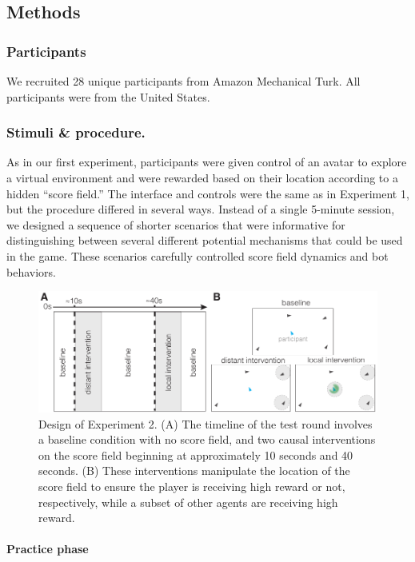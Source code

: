 \documentclass[12pt,letterpaper]{article}
\begin{document}
\subsection{Methods}
\subsubsection{Participants}

We recruited 28 unique participants from Amazon Mechanical Turk.
All participants were from the United States.

\subsubsection{Stimuli \& procedure.}

As in our first experiment, participants were given control of an avatar to explore a virtual environment and were rewarded based on their location according to a hidden ``score field.'' 
The interface and controls were the same as in Experiment 1, but the procedure differed in several ways. 
Instead of a single 5-minute session, we designed a sequence of shorter scenarios that were informative for distinguishing between several different potential mechanisms that could be used in the game. 
These scenarios carefully controlled score field dynamics and bot behaviors. 

\begin{figure}[t!]
  \centering
  \includegraphics[width=1\textwidth]{./figures/exp2_design.pdf}
  \caption{Design of Experiment 2. (A) The timeline of the test round involves a baseline condition with no score field, and two causal interventions on the score field beginning at approximately 10 seconds and 40 seconds. (B) These interventions manipulate the location of the score field to ensure the player is receiving high reward or not, respectively, while a subset of other agents are receiving high reward.}
  \label{fig:exp2_design}
\end{figure}

\paragraph{Practice phase}
\end{document}
